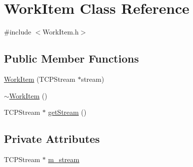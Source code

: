 \hypertarget{classWorkItem}{\section{Work\+Item Class Reference}
\label{classWorkItem}
}


{\ttfamily \#include $<$Work\+Item.\+h$>$}

\subsection*{Public Member Functions}
\begin{DoxyCompactItemize}
\item 
\hyperlink{classWorkItem_ad60cf27c32cf70bfb33767113b608bf8}{Work\+Item} (T\+C\+P\+Stream $\ast$stream)
\item 
\hyperlink{classWorkItem_aa9f7978be78e1a12cf3e20a7196d2066}{$\sim$\+Work\+Item} ()
\item 
T\+C\+P\+Stream $\ast$ \hyperlink{classWorkItem_aad178e1781f5cfc244e3046ed8297f22}{get\+Stream} ()
\end{DoxyCompactItemize}
\subsection*{Private Attributes}
\begin{DoxyCompactItemize}
\item 
T\+C\+P\+Stream $\ast$ \hyperlink{classWorkItem_aea302e3afcf491fa7dd2d70f83e2906b}{m\+\_\+stream}
\end{DoxyCompactItemize}


